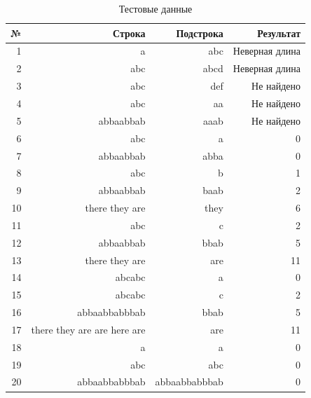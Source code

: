 \documentclass[a4paper,12pt]{article}
\begin{document}
\begin{table} [h!]
\begin{center}
\caption{Тестовые данные}
\begin{tabular}{|r|r|r|r|}
\hline
         № &     Строка &  Подстрока &  Результат \\
\hline
         1 &          a &        abc &  $\text{Неверная длина}$ \\
\hline
         2 &        abc &       abcd &  $\text{Неверная длина}$ \\
\hline
         3 &        abc &        def &  $\text{Не найдено}$ \\
\hline
         4 &        abc &         aa &  $\text{Не найдено}$ \\
\hline
         5 &  abbaabbab &       aaab &  $\text{Не найдено}$ \\
\hline
         6 &        abc &          a &          0 \\
\hline
         7 &  abbaabbab &       abba &          0 \\
\hline
         8 &        abc &          b &          1 \\
\hline
         9 &  abbaabbab &       baab &          2 \\
\hline
        10 & there they are &       they &          6 \\
\hline
        11 &        abc &          c &          2 \\
\hline
        12 &  abbaabbab &       bbab &          5 \\
\hline
        13 & there they are &        are &         11 \\
\hline
        14 &     abcabc &          a &          0 \\
\hline
        15 &     abcabc &          c &          2 \\
\hline
        16 & abbaabbabbbab &       bbab &          5 \\
\hline
        17 & there they are are here are &        are &         11 \\
\hline
        18 &          a &          a &          0 \\
\hline
        19 &        abc &        abc &          0 \\
\hline
        20 & abbaabbabbbab & abbaabbabbbab &          0 \\
\hline
\end{tabular} 

\label{test0}
\end{center}
\end{table}
\end{document}
